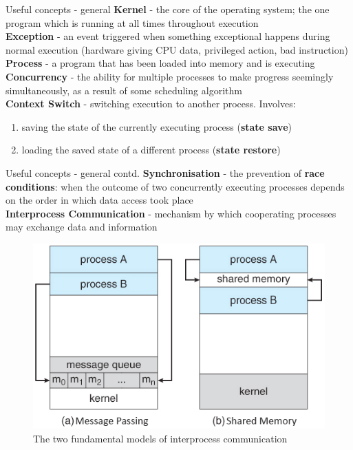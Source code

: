 \documentclass[10pt]{beamer}
\begin{document}
\begin{frame}{Useful concepts - general}
    \textbf{Kernel} - the core of the operating system; the one program which is running at all times throughout execution \\

    \textbf{Exception} - an event triggered when something exceptional happens during normal execution (hardware giving CPU data, privileged action, bad instruction) \\

    \textbf{Process} - a program that has been loaded into memory and is executing \\

    \textbf{Concurrency} - the ability for multiple processes to make progress seemingly simultaneously, as a result of some scheduling algorithm \\

    \textbf{Context Switch} - switching execution to another process. Involves:
    \begin{enumerate}
        \item saving the state of the currently executing process (\textbf{state save})
        \item loading the saved state of a different process (\textbf{state restore})
    \end{enumerate}
\end{frame}

\begin{frame}{Useful concepts - general contd.}
    \textbf{Synchronisation} - the prevention of \textbf{race conditions}: when the outcome of two concurrently executing processes depends on the order in which data access took place \\

    \textbf{Interprocess Communication} - mechanism by which cooperating processes may exchange data and information

    \begin{figure}[h]
        \includegraphics[width=.5\textwidth]{ipc.png}
        \caption{The two fundamental models of interprocess communication}
    \end{figure}
\end{frame}
\end{document}
